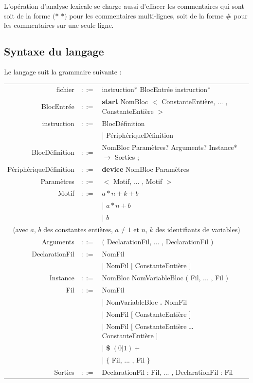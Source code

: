 \documentclass[13pt]{article}
\begin{document}
L'opération d'analyse lexicale se charge aussi d'effacer les commentaires qui
sont soit de la forme \og $(*$\fg{} \og $*)$\fg{} pour les commentaires
multi-lignes, soit de la forme \og \#\fg{} pour les commentaires sur une seule ligne.

\subsection{Syntaxe du langage}
Le langage suit la grammaire suivante :\newline\newline
\begin{tabular}{ r c l }
  fichier &$::=$&\: instruction* BlocEntrée instruction*\\ [1.5ex]
  BlocEntrée &$::=$&\: {\bf start} NomBloc $<$ ConstanteEntière, ... ,
  ConstanteEntière  $>$\\ [1.5ex]
  instruction &$::=$&\: BlocDéfinition\\
  &&| PériphériqueDéfinition \\ [1.5ex]
  BlocDéfinition &$::=$&\: NomBloc Paramètres? Arguments? Instance* $\to$
  Sorties $;$\\ [1.5ex]
  PériphériqueDéfinition &$::=$&\: {\bf device} NomBloc Paramètres\\ [1.5ex]
  Paramètres &$::=$&\: $<$ Motif, ... , Motif $>$\\ [1.5ex]
  Motif &$::=$&\: $a*n+k+b$     \\ 
  &&| $a*n+b$  \\ 
  &&| $b$ \\ 
  \multicolumn{3}{c}{(avec $a$, $b$ des constantes entières, $a
    \neq 1$ et $n$, $k$ des identifiants de variables)} \\ [1.5ex]
  Arguments &$::=$&\: $($ DeclarationFil, ... , DeclarationFil $)$ \\ [1.5ex]
  DeclarationFil  &$::=$&\: NomFil \\
  &&| NomFil $[$ ConstanteEntière $]$ \\ [1.5ex]
 
  Instance &$::=$&\: NomBloc NomVariableBloc $($ Fil, ... , Fil $)$ \\ [1.5ex]
  Fil &$::=$&\: NomFil\\
  &&| NomVariableBloc {\bf .} NomFil\\
  &&| NomFil $[$ ConstanteEntière $]$\\
  &&| NomFil $[$ ConstanteEntière {\bf..} ConstanteEntière $]$\\
  &&| {\bf \$} $(0|1)+$ \\
  &&| $\mathbf{\{}$ Fil, ... , Fil $\mathbf{\}}$\\ [1.5ex]
  Sorties&$::=$&\: DeclarationFil : Fil, ... , DeclarationFil : Fil
\end{tabular}
\end{document}
